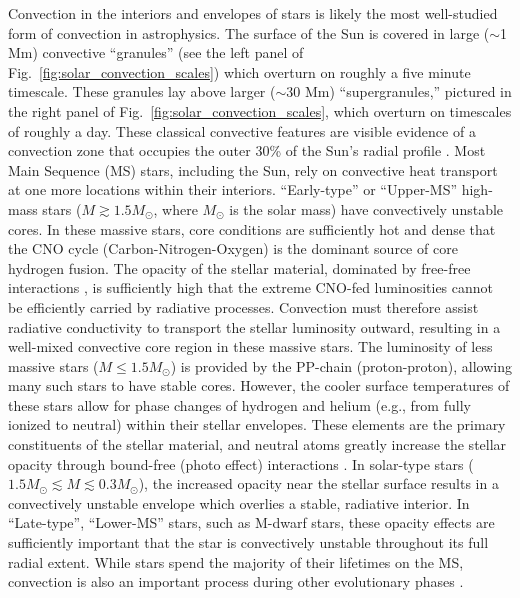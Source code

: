 Convection in the interiors and envelopes of stars is likely the most well-studied form of convection in astrophysics.
The surface of the Sun is covered in large ($\sim$1 Mm) convective ``granules'' (see the left panel of Fig.~\ref{fig:solar_convection_scales}) which overturn on roughly a five minute timescale.
These granules lay above larger ($\sim$30 Mm) ``supergranules,'' pictured in the right panel of Fig.~\ref{fig:solar_convection_scales}, which overturn on timescales of roughly a day.
These classical convective features are visible evidence of a convection zone that occupies the outer 30\% of the Sun's radial profile \citep{miesch2005, nordlund&all2009}.
Most Main Sequence (MS) stars, including the Sun, rely on convective heat transport at one more locations within their interiors.
``Early-type'' or ``Upper-MS'' high-mass stars ($M \gtrsim 1.5 M_\odot$, where $M_\odot$ is the solar mass) have convectively unstable cores.
In these massive stars, core conditions are sufficiently hot and dense that the CNO cycle (Carbon-Nitrogen-Oxygen) is the dominant source of core hydrogen fusion.
The opacity of the stellar material, dominated by free-free interactions \citep[c.f.~Ch.~16 of][]{weiss&all2004}, is sufficiently high that the extreme CNO-fed luminosities cannot be efficiently carried by radiative processes.
Convection must therefore assist radiative conductivity to transport the stellar luminosity outward, resulting in a well-mixed convective core region in these massive stars.
The luminosity of less massive stars ($M \leq 1.5 M_\odot$) is provided by the PP-chain (proton-proton), allowing many such stars to have stable cores.
However, the cooler surface temperatures of these stars allow for phase changes of hydrogen and helium (e.g., from fully ionized to neutral) within their stellar envelopes.
These elements are the primary constituents of the stellar material, and neutral atoms greatly increase the stellar opacity through bound-free (photo effect) interactions \citep[and these effects were studied by][]{rast&toomre1993a, rast&toomre1993b}.
In solar-type stars ($1.5 M_\odot \lesssim M \lesssim 0.3 M_\odot$), the increased opacity near the stellar surface results in a convectively unstable envelope which overlies a stable, radiative interior.
In ``Late-type'', ``Lower-MS'' stars, such as M-dwarf stars, these opacity effects are sufficiently important that the star is convectively unstable throughout its full radial extent.
While stars spend the majority of their lifetimes on the MS, convection is also an important process during other evolutionary phases \citep[and I refer the reader to chapter 2 of][for a broad but brief overview of stellar evolutionary phases]{HKT}.

